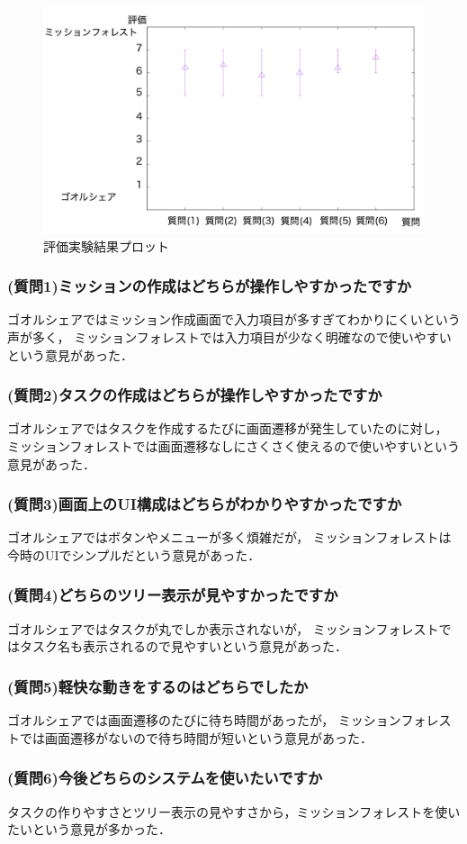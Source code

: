 \begin{figure}[t]
	\begin{center}
		\includegraphics[width=0.9\linewidth]{assets/img/experiment_result.png}
		\caption{評価実験結果プロット}
		\label{graph:experiment_result}
	\end{center}
\end{figure}

\subsubsection{(質問1)ミッションの作成はどちらが操作しやすかったですか}
ゴオルシェアではミッション作成画面で入力項目が多すぎてわかりにくいという声が多く，
ミッションフォレストでは入力項目が少なく明確なので使いやすいという意見があった．

\subsubsection{(質問2)タスクの作成はどちらが操作しやすかったですか}
ゴオルシェアではタスクを作成するたびに画面遷移が発生していたのに対し，
ミッションフォレストでは画面遷移なしにさくさく使えるので使いやすいという意見があった．

\subsubsection{(質問3)画面上のUI構成はどちらがわかりやすかったですか}
ゴオルシェアではボタンやメニューが多く煩雑だが，
ミッションフォレストは今時のUIでシンプルだという意見があった．

\subsubsection{(質問4)どちらのツリー表示が見やすかったですか}
ゴオルシェアではタスクが丸でしか表示されないが，
ミッションフォレストではタスク名も表示されるので見やすいという意見があった．

\subsubsection{(質問5)軽快な動きをするのはどちらでしたか}
ゴオルシェアでは画面遷移のたびに待ち時間があったが，
ミッションフォレストでは画面遷移がないので待ち時間が短いという意見があった．

\subsubsection{(質問6)今後どちらのシステムを使いたいですか}
タスクの作りやすさとツリー表示の見やすさから，ミッションフォレストを使いたいという意見が多かった．
